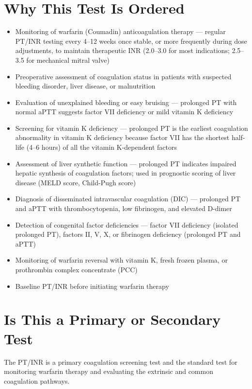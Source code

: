 \section*{Why This Test Is Ordered}
\begin{itemize}
  \item Monitoring of warfarin (Coumadin) anticoagulation therapy --- regular PT/INR testing every 4--12 weeks once stable, or more frequently during dose adjustments, to maintain therapeutic INR (2.0--3.0 for most indications; 2.5--3.5 for mechanical mitral valve)
  \item Preoperative assessment of coagulation status in patients with suspected bleeding disorder, liver disease, or malnutrition
  \item Evaluation of unexplained bleeding or easy bruising --- prolonged PT with normal aPTT suggests factor VII deficiency or mild vitamin K deficiency
  \item Screening for vitamin K deficiency --- prolonged PT is the earliest coagulation abnormality in vitamin K deficiency because factor VII has the shortest half-life (4--6 hours) of all the vitamin K-dependent factors
  \item Assessment of liver synthetic function --- prolonged PT indicates impaired hepatic synthesis of coagulation factors; used in prognostic scoring of liver disease (MELD score, Child-Pugh score)
  \item Diagnosis of disseminated intravascular coagulation (DIC) --- prolonged PT and aPTT with thrombocytopenia, low fibrinogen, and elevated D-dimer
  \item Detection of congenital factor deficiencies --- factor VII deficiency (isolated prolonged PT), factors II, V, X, or fibrinogen deficiency (prolonged PT and aPTT)
  \item Monitoring of warfarin reversal with vitamin K, fresh frozen plasma, or prothrombin complex concentrate (PCC)
  \item Baseline PT/INR before initiating warfarin therapy
\end{itemize}

\section*{Is This a Primary or Secondary Test}
The PT/INR is a primary coagulation screening test and the standard test for monitoring warfarin therapy and evaluating the extrinsic and common coagulation pathways.


